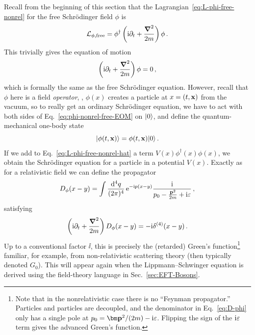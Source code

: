 Recall from the beginning of this section that the 
Lagrangian~\eqref{eq:L-phi-free-nonrel} for the free Schr\"odinger field 
$\phi$ is
%
\begin{equation}
 \LL_{\phi,\text{free}} = \phi^\dagger
 \left(\ii\partial_t + \frac{\Laplace}{2m}\right)\phi \,.
\label{eq:L-phi-free-nonrel-hat}
\end{equation}
%
This trivially gives the equation of motion
%
\begin{equation}
 \left(\ii\partial_t + \frac{\Laplace}{2m}\right)\phi = 0 \,,
\label{eq:phi-nonrel-free-EOM}
\end{equation}
%
which is formally the same as the free Schr\"odinger equation.  However, recall 
that $\phi$ here is a field \emph{operator}, \ie, $\phi(x)$ creates a particle 
at $x=(t,\mathbf{x})$ from the vacuum, so to really get an ordinary Schr\"odinger 
equation, we have to act with both sides of Eq.~\eqref{eq:phi-nonrel-free-EOM} 
on $|0\rangle$, and define the quantum-mechanical one-body state
%
\begin{equation}
 |\phi(t,\mathbf{x})\rangle = \phi(t,\mathbf{x})|0\rangle \,.
\end{equation}
%
If we add to Eq.~\eqref{eq:L-phi-free-nonrel-hat} a term 
$V(x)\phi^\dagger(x)\phi(x)$, we obtain the Schr\"odinger equation for a 
particle in a potential $V(x)$.  Exactly as for a relativistic field we can 
define the propagator
%
\begin{equation}
 D_\phi(x-y)
 = \int\frac{\dd^4q}{(2\pi)^4} \, \eex^{{-}\ii p(x-y)}
 \frac{\ii}{p_0-\frac{\vp^2}{2m} + \ii\eps} \,,
\label{eq:D-phi}
\end{equation}
%
satisfying
%
\begin{equation}
 \left(\mathrm{i}\partial_t + \frac{\boldsymbol{\nabla}^2}{2m}\right)D_\phi(x-y)
 = {-}\mathrm{i} \delta^{(4)}(x-y) \,.
\end{equation}
%
Up to a conventional factor $\ii$, this is precisely the (retarded) Green's 
function\footnote{Note that in the nonrelativistic case there is no ``Feynman 
propagator.''  Particles and particles are decoupled, and the denominator in 
Eq.~\eqref{eq:D-phi} only has a single pole at $p_0=\vec{\vp^2}/(2m)-\ii\eps$.  
Flipping the sign of the $\mathrm{i}\varepsilon$ term gives the advanced Green's function.} 
familiar, for example, from non-relativistic scattering theory (then typically 
denoted $G_0$).  This will appear again when the Lippmann--Schwinger equation 
is derived using the field-theory language in Sec.~\ref{sec:EFT-Bosons}.


